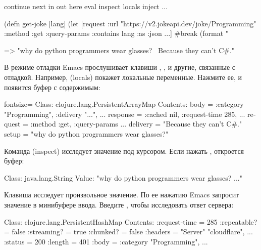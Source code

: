 \begin{english}
  \begin{text}
continue next in out here eval inspect locals inject ...

(defn get-joke [lang]
  (let [request
        {:url "https://v2.jokeapi.dev/joke/Programming"
         :method :get
         :query-params {:contains lang}
         :as :json}
        ...]
    #break
    (format "%

 => "why do python programmers wear glasses? \
     Because they can't C#."
  \end{text}
\end{english}

В режиме отладки Emacs прослушивает клавиши , ,  и другие, связанные с отладкой. Например,  (locals) покажет локальные переменные. Нажмите ее, и появится буфер с содержимым:

\begin{english}
  \begin{text*}{fontsize=\small}
Class: clojure.lang.PersistentArrayMap
Contents:
  body = { :category "Programming", :delivery "...",  ... }
  response = { :cached nil, :request-time 285,  ... }
  request = { :method :get, :query-params ... }
  delivery = "Because they can't C#."
  setup = "why do python programmers wear glasses?"
  \end{text*}
\end{english}

Команда  (inspect) исследует значение под курсором. Если нажать , откроется буфер:

\begin{english}
  \begin{text}
Class: java.lang.String
Value: "why do python programmers wear glasses? ..."
  \end{text}
\end{english}

Клавиша  исследует произвольное значение. По ее нажатию Emacs запросит значение в минибуфере ввода. Введите , чтобы исследовать ответ сервера:

\begin{english}
  \begin{text}
Class: clojure.lang.PersistentHashMap
Contents:
  :request-time = 285
  :repeatable? = false
  :streaming? = true
  :chunked? = false
  :headers = { "Server" "cloudflare", ... }
  :status = 200
  :length = 401
  :body = { :category "Programming",  ... }
  \end{text}
\end{english}

